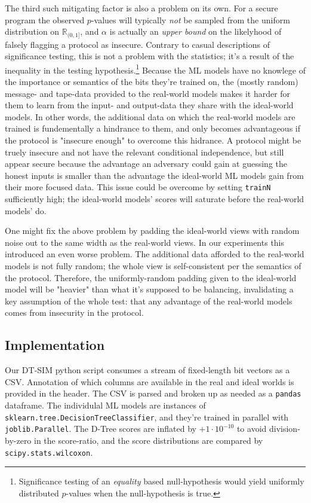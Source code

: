 \documentclass[compsoc, conference, a4paper, 10pt, times]{IEEEtran}
\newcommand{\toolname}{\textsc{DT-SIM}\xspace}
\begin{document}
The third such mitigating factor is also a problem on its own.
For a secure program the observed $p$-values
will typically \textit{not} be sampled from the uniform distribution on $\mathbb{R}_{(0,1]}$,
and $\alpha$ is actually an \textit{upper bound} on the likelyhood of falsely flagging a protocol as insecure.
Contrary to casual descriptions of significance testing, this is not a problem with the statistics;
it's a result of the inequality in the testing hypothesis.\footnote{
    Significance testing of an \textit{equality} based null-hypothesis would yield uniformly distributed $p$-values when the null-hypothesis is true.
}
Because the ML models have no knowlege of the importance or semantics of the bits they're trained on,
the (mostly random) message- and tape-data provided to the real-world models makes it harder for them
to learn from the input- and output-data they share with the ideal-world models.
In other words, the additional data on which the real-world models are trained is fundementally a hindrance to them,
and only becomes advantageous if the protocol is "insecure enough" to overcome this hidrance.
A protocol might be truely insecure and not have the relevant conditional independence,
but still appear secure because the advantage an adversary could gain at guessing the honest inputs
is smaller than the advantage the ideal-world ML models gain from their more focused data.
This issue could be overcome by setting \texttt{trainN} sufficiently high;
the ideal-world models' scores will saturate before the real-world models' do.

One might fix the above problem by padding the ideal-world views with random noise out to the same width as the real-world views.
In our experiments this introduced an even worse problem.
The additional data afforded to the real-world models is not fully random;
the whole view is self-consistent per the semantics of the protocol.
Therefore, the uniformly-random padding given to the ideal-world model will be "heavier" than what it's supposed to be balancing,
invalidating a key assumption of the whole test:
that any advantage of the real-world models comes from insecurity in the protocol.

\subsection{Implementation}

Our \toolname python script consumes a stream of fixed-length bit vectors as a CSV.
Annotation of which columns are available in the real and ideal worlds is provided in the header.
The CSV is parsed and broken up as needed as a \texttt{pandas} dataframe.
The individulal ML models are instances of \texttt{sklearn.tree.DecisionTreeClassifier},
and they're trained in parallel with \texttt{joblib.Parallel}.
The D-Tree scores are inflated by $+1 \cdot 10^{-10}$ to avoid division-by-zero in the score-ratio,
and the score distributions are compared by \texttt{scipy.stats.wilcoxon}.
\end{document}
